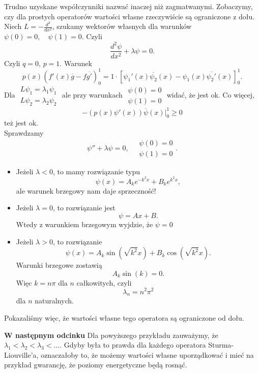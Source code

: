 \documentclass[../main.tex]{subfiles}
\begin{document}
\begin{przyklad}
		Trudno uzyskane współczynniki nazwać inaczej niż zagmatwanymi. Zobaczymy, czy dla prostych operatorów wartości własne rzeczywiście są ograniczone z dołu. Niech $L = - \frac{d^2}{dx^2}$, szukamy wektorów własnych dla warunków $\psi(0) = 0,\quad \psi(1) = 0$.
		Czyli
		\[
				\frac{d^2\psi}{dx^2} + \lambda \psi = 0
		.\]
		Czyli $q = 0$, $p = 1$. Warunek
		\[
				p(x) \left( f'(x)\overline{g} - f \overline{g'}  \right)_0^1 = 1 \cdot \left[ \psi_1'(x)\overline{\psi_2}(x) - \psi_1(x) \overline{\psi_2'} (x) \right] _0^1
		.\]
		Dla $\begin{matrix} L\psi_1 = \lambda_1\psi_1\\ L\psi_2 = \lambda_2\psi_2 \end{matrix} $ ale przy warunkach $\begin{matrix} \psi(0) = 0\\ \psi(1) = 0  \end{matrix} $ widać, że jest ok. Co więcej,
				\[
						-\left( p(x) \psi'(x) \right) \overline{\psi} (x)|_0^1 \ge 0
				\]
				też jest ok.\\
				Sprawdzamy
				\[
						\psi''+ \lambda \psi = 0,\quad \begin{matrix} \psi(0) = 0\\ \psi(1) = 0 \end{matrix}
				.\]
\begin{itemize}
		\item Jeżeli $\lambda < 0$, to mamy rozwiązanie typu
				\[
						\psi(x) = A_k e^{-k^2 x} + B_k e^{k^2 x}
				,\]
				ale warunek brzegowy nam daje sprzeczność!
		\item Jeżeli $\lambda = 0$, to rozwiązanie jest
				\[
				\psi = Ax + B
				.\]
				Wtedy z warunkiem brzegowym wyjdzie, że $\psi = 0$
		\item Jeżeli $\lambda > 0$, to rozwiązanie
				\[
						\psi(x) = A_k\sin\left( \sqrt{k^2} x \right)+ B_k \cos\left(\sqrt{k^2} x \right)
				.\]
				Warunki brzegowe zostawią
				\[
						A_k\sin(k) = 0
				.\]
				Więc $k = n\pi$ dla  $n$ całkowitych, czyli
				\[
				\lambda_n = n^2 \pi^2
				\]
				dla $n$ naturalnych.
\end{itemize}
Pokazaliśmy więc, że wartości własne tego operatora są ograniczone od dołu.

		\textbf{W następnym odcinku} Dla powyższego przykładu zauważymy, że $\lambda_1 < \lambda_2 < \lambda_3 < \ldots$. Gdyby była to prawda dla każdego operatora Sturma-Liouville'a, oznaczałoby to, że możemy wartości własne uporządkować i mieć na przykład gwarancję, że poziomy energetyczne będą rosnąć.
\end{przyklad}
\end{document}
